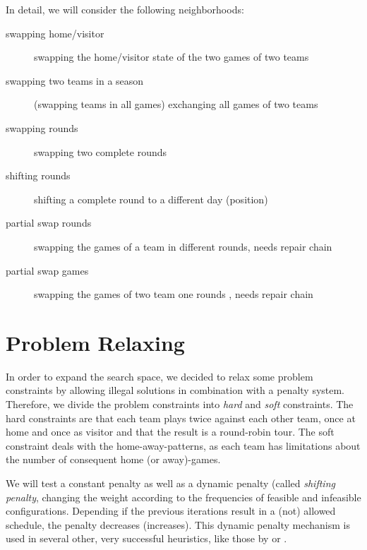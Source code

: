 \documentclass[a4paper,11pt]{article}
\begin{document}
In detail, we will consider the following neighborhoods:
\begin{description}
	\item[swapping home/visitor] swapping the home/visitor state of the two games of two teams
	\item[swapping two teams in a season] (swapping teams in all games) exchanging all games of two teams
	\item[swapping rounds] swapping two complete rounds
	\item[shifting rounds] shifting a complete round to a different day (position)
	\item[partial swap rounds] swapping the games of a team in different rounds, \cite{Gaspero07,HentenryckV06, Chen_anant} needs repair chain
	\item[partial swap games] swapping the games of two team one rounds \cite{Gaspero07, HentenryckV06}, needs repair chain
\end{description}

\section{Problem Relaxing}
In order to expand the search space, we decided to relax some problem constraints by allowing illegal solutions in combination with a penalty system.
Therefore, we divide the problem constraints into \emph{hard} and \emph{soft} constraints. The hard constraints are that each team plays twice against each other team, once at home and once as visitor and that the result is a round-robin tour. The soft constraint deals with the home-away-patterns, as each team has limitations about the number of consequent home (or away)-games.

We will test a constant penalty as well as a dynamic penalty (called \emph{shifting penalty}, changing the weight according to the frequencies of feasible and infeasible configurations. Depending if the previous iterations result in a (not) allowed schedule, the penalty decreases (increases). This dynamic penalty mechanism is used in several other, very successful heuristics, like those by \cite{Anagnostopoulos06} or \cite{Gaspero07}.



\end{document}
